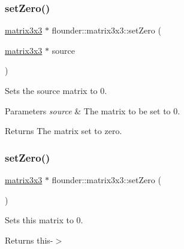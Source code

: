 \subsubsection{\texorpdfstring{set\+Zero()}{setZero()}\hspace{0.1cm}{\footnotesize\ttfamily [1/2]}}
{\footnotesize\ttfamily \hyperlink{classflounder_1_1matrix3x3}{matrix3x3} $\ast$ flounder\+::matrix3x3\+::set\+Zero (\begin{DoxyParamCaption}\item[{\hyperlink{classflounder_1_1matrix3x3}{matrix3x3} $\ast$}]{source }\end{DoxyParamCaption})\hspace{0.3cm}{\ttfamily [static]}}



Sets the source matrix to 0. 


\begin{DoxyParams}{Parameters}
{\em source} & The matrix to be set to 0. \\
\hline
\end{DoxyParams}
\begin{DoxyReturn}{Returns}
The matrix set to zero. 
\end{DoxyReturn}
\mbox{\label{classflounder_1_1matrix3x3_abcc962b1acd586ec1f3ad554f1eb32f7}} 
\subsubsection{\texorpdfstring{set\+Zero()}{setZero()}\hspace{0.1cm}{\footnotesize\ttfamily [2/2]}}
{\footnotesize\ttfamily \hyperlink{classflounder_1_1matrix3x3}{matrix3x3} $\ast$ flounder\+::matrix3x3\+::set\+Zero (\begin{DoxyParamCaption}{ }\end{DoxyParamCaption})}



Sets this matrix to 0. 

\begin{DoxyReturn}{Returns}
this-\/$>$ 
\end{DoxyReturn}
\mbox{\label{classflounder_1_1matrix3x3_a1463caf26c6c57264d767f09f3ef954d}} 
